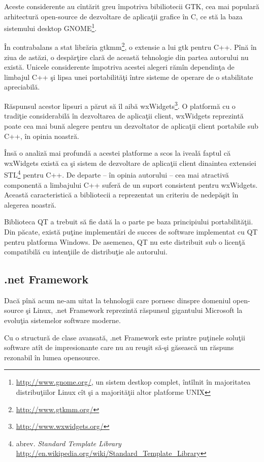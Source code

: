 Aceste considerente au cîntărit greu împotriva bibiliotecii GTK, cea mai 
populară arhitectură open-source de dezvoltare de aplicaţii grafice în C, ce 
stă la baza sistemului desktop GNOME\footnote{\url{http://www.gnome.org/}, un 
sistem destkop complet, întîlnit în majoritatea distribuţiilor Linux cît şi a 
majorităţii altor platforme UNIX}.

În contrabalans a stat librăria gtkmm\footnote{\url{http://www.gtkmm.org/}}, o 
extensie a lui gtk pentru C++. Pînă în ziua de astăzi, o despărţire clară de 
această tehnologie din partea autorului nu există. Unicele considerente 
împotriva acestei alegeri rămîn dependinţa de limbajul C++ şi lipsa unei 
portabilităţi între sisteme de operare de o stabilitate apreciabilă.

Răspunsul acestor lipsuri a părut să îl aibă 
wxWidgets\footnote{\url{http://www.wxwidgets.org/}}. O platformă cu o tradiţie 
considerabilă în dezvoltarea de aplicaţii client, wxWidgets reprezintă poate 
cea mai bună alegere pentru un dezvoltator de aplicaţii client portabile sub 
C++, în opinia noastră.

Însă o analiză mai profundă a acestei platforme a scos la iveală faptul că 
wxWidgets există ca şi sistem de dezvoltare de aplicaţii client dinaintea 
extensiei STL\footnote{abrev. \textit{Standard Template Library} 
\url{http://en.wikipedia.org/wiki/Standard_Template_Library}} pentru C++. De 
departe -- în opinia autorului -- cea mai atractivă componentă a limbajului C++ 
suferă de un suport consistent pentru wxWidgets.\cite{wxfaq} Această 
caracteristică a bibliotecii a reprezentat un criteriu de nedepăşit în alegerea 
noastră.

Biblioteca QT a trebuit să fie dată la o parte pe baza principiului 
portabilităţii. Din păcate, există puţine implementări de succes de software 
implementat cu QT pentru platforma Windows. De asemenea, QT nu este distribuit 
sub o licenţă compatibilă cu intenţiile de distribuţie ale autorului.

\subsection{.net Framework}

Dacă pînă acum ne-am uitat la tehnologii care pornesc dinspre domeniul 
open-source şi Linux, .net Framework reprezintă răspunsul gigantului Microsoft 
la evoluţia sistemelor software moderne.

Cu o structură de clase avansată, .net Framework este printre puţinele soluţii 
software atît de impresionante care nu au reuşit să-şi găsească un răspuns 
rezonabil în lumea opensource.

